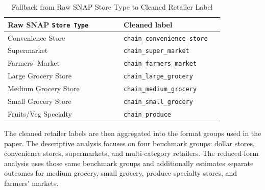\documentclass[12pt]{article}
\begin{document}
\begin{appendices}
\begin{table}[!htbp]
\centering
\caption{Fallback from Raw SNAP Store Type to Cleaned Retailer Label}
\label{tab:retailer-storetype-rules}
\small
\begin{tabular}{p{0.48\linewidth}p{0.36\linewidth}}
\hline
Raw SNAP \texttt{Store Type} & Cleaned label \\
\hline
Convenience Store & \texttt{chain\_convenience\_store} \\
Supermarket & \texttt{chain\_super\_market} \\
Farmers' Market & \texttt{chain\_farmers\_market} \\
Large Grocery Store & \texttt{chain\_large\_grocery} \\
Medium Grocery Store & \texttt{chain\_medium\_grocery} \\
Small Grocery Store & \texttt{chain\_small\_grocery} \\
Fruits/Veg Specialty & \texttt{chain\_produce} \\
\hline
\end{tabular}
\end{table}

The cleaned retailer labels are then aggregated into the format groups used in the paper. The descriptive analysis focuses on four benchmark groups: dollar stores, convenience stores, supermarkets, and multi-category retailers. The reduced-form analysis uses those same benchmark groups and additionally estimates separate outcomes for medium grocery, small grocery, produce specialty stores, and farmers' markets.




\end{appendices}
\end{document}
